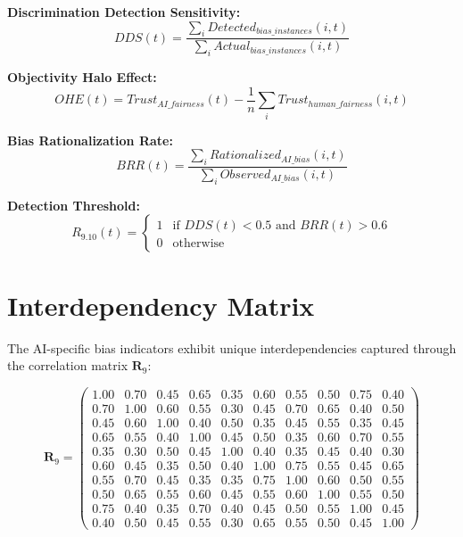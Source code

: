 \documentclass[11pt,a4paper]{article}
\begin{document}
\textbf{Discrimination Detection Sensitivity:}
\begin{equation}
DDS(t) = \frac{\sum_{i} Detected_{bias\_instances}(i,t)}{\sum_{i} Actual_{bias\_instances}(i,t)}
\end{equation}

\textbf{Objectivity Halo Effect:}
\begin{equation}
OHE(t) = Trust_{AI\_fairness}(t) - \frac{1}{n}\sum_{i} Trust_{human\_fairness}(i,t)
\end{equation}

\textbf{Bias Rationalization Rate:}
\begin{equation}
BRR(t) = \frac{\sum_{i} Rationalized_{AI\_bias}(i,t)}{\sum_{i} Observed_{AI\_bias}(i,t)}
\end{equation}

\textbf{Detection Threshold:}
\begin{equation}
R_{9.10}(t) = \begin{cases}
1 & \text{if } DDS(t) < 0.5 \text{ and } BRR(t) > 0.6 \\
0 & \text{otherwise}
\end{cases}
\end{equation}

\section{Interdependency Matrix}

The AI-specific bias indicators exhibit unique interdependencies captured through the correlation matrix $\mathbf{R}_{9}$:

\begin{equation}
\mathbf{R}_9 = \begin{pmatrix}
1.00 & 0.70 & 0.45 & 0.65 & 0.35 & 0.60 & 0.55 & 0.50 & 0.75 & 0.40 \\
0.70 & 1.00 & 0.60 & 0.55 & 0.30 & 0.45 & 0.70 & 0.65 & 0.40 & 0.50 \\
0.45 & 0.60 & 1.00 & 0.40 & 0.50 & 0.35 & 0.45 & 0.55 & 0.35 & 0.45 \\
0.65 & 0.55 & 0.40 & 1.00 & 0.45 & 0.50 & 0.35 & 0.60 & 0.70 & 0.55 \\
0.35 & 0.30 & 0.50 & 0.45 & 1.00 & 0.40 & 0.35 & 0.45 & 0.40 & 0.30 \\
0.60 & 0.45 & 0.35 & 0.50 & 0.40 & 1.00 & 0.75 & 0.55 & 0.45 & 0.65 \\
0.55 & 0.70 & 0.45 & 0.35 & 0.35 & 0.75 & 1.00 & 0.60 & 0.50 & 0.55 \\
0.50 & 0.65 & 0.55 & 0.60 & 0.45 & 0.55 & 0.60 & 1.00 & 0.55 & 0.50 \\
0.75 & 0.40 & 0.35 & 0.70 & 0.40 & 0.45 & 0.50 & 0.55 & 1.00 & 0.45 \\
0.40 & 0.50 & 0.45 & 0.55 & 0.30 & 0.65 & 0.55 & 0.50 & 0.45 & 1.00
\end{pmatrix}
\end{equation}
\end{document}
